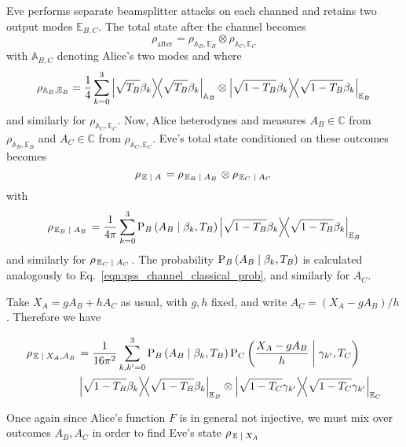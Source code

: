 \noindent Eve performs separate beamsplitter attacks on each channed and retains two output modes $\mathbb{E}_{B, C}$. The total state after the channel becomes
\begin{equation}
\rho_{\text{after}} = \rho_{\mathbb{A}_B, \mathbb{E}_B} \otimes \rho_{\mathbb{A}_C, \mathbb{E}_C}
\end{equation}
with $\mathbb{A}_{B, C}$ denoting Alice's two modes and where
\begin{equation}
\rho_{\mathbb{A}_B, \mathbb{E}_B} = \frac{1}{4} \sum_{k=0}^3 \dyad{\sqrt{T_B} \beta_k}_{\mathbb{A}_B} \otimes \dyad{\sqrt{1-T_B} \beta_k}_{\mathbb{E}_B}
\end{equation}
and similarly for $\rho_{\mathbb{A}_C, \mathbb{E}_C}$. Now, Alice heterodynes and measures $A_B \in \mathbb{C}$ from $\rho_{\mathbb{A}_B, \mathbb{E}_B}$ and $A_C \in \mathbb{C}$ from $\rho_{\mathbb{A}_C, \mathbb{E}_C}$. Eve's total state conditioned on these outcomes becomes 
\begin{equation}
\rho_{\left.\mathbb{E} \; \middle| \; A\right.} = \rho_{\left.\mathbb{E}_B \; \middle| \; A_B\right.} \otimes \rho_{\left. \mathbb{E}_C \; \middle| \; A_C\right.}
\end{equation}
with
\begin{equation}
\rho_{\left.\mathbb{E}_B \given A_B\right.} = \frac{1}{4 \pi} \sum_{k=0}^3 \text{P}_B\left(A_B \given \beta_k, T_B\right) \dyad{\sqrt{1-T_B} \beta_k}_{\mathbb{E}_B}
\end{equation}
and similarly for $\rho_{\left.\mathbb{E}_C \; \middle| \; A_C\right.}$. The probability $\text{P}_B\left(A_B \; \middle| \; \beta_k, T_B\right)$ is calculated analogously to Eq.~\ref{eqn:qss_channel_classical_prob}, and similarly for $A_C$.

Take $X_A = g A_B + h A_C$ as usual, with $g, h$ fixed, and write $A_C = \left(X_A - g A_B\right)/h$. Therefore we have

\begin{align}
\rho_{\left. \mathbb{E} \given X_A, A_B\right.} &= \frac{1}{16 \pi^2} \sum_{k, k^\prime = 0}^3 \text{P}_B\left(A_B \given \beta_k, T_B\right) \text{P}_C\left(\frac{X_A - g A_B}{h} \given \gamma_{k^\prime}, T_C\right) \notag \\
%
&\dyad{\sqrt{1-T_B} \beta_k}_{\mathbb{E}_B} \otimes \dyad{\sqrt{1-T_C}\gamma_{k^\prime}}_{\mathbb{E}_C}
\end{align}

\noindent Once again since Alice's function $F$ is in general not injective, we must mix over outcomes $A_B, A_C$ in order to find Eve's state $\rho_{\left.\mathbb{E} \; \middle| \; X_A\right.}$

